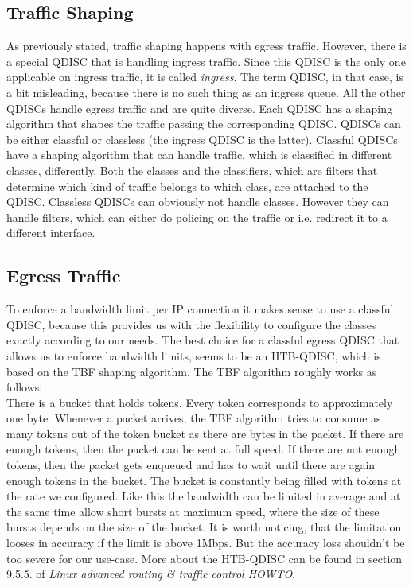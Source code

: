 \subsection{Traffic Shaping}
As previously stated, traffic shaping happens with egress traffic. However, there is a special \acs{QDISC} that is handling ingress traffic. Since this \acs{QDISC} is the only one applicable on ingress traffic, it is called \textit{ingress}. The term \acl{QDISC}, in that case, is a bit misleading, because there is no such thing as an ingress queue. All the other \acsp{QDISC} handle egress traffic and are quite diverse. Each \acs{QDISC} has a shaping algorithm that shapes the traffic passing the corresponding \acs{QDISC}. \acsp{QDISC} can be either classful or classless (the ingress \acs{QDISC} is the latter). Classful \acsp{QDISC} have a shaping algorithm that can handle traffic, which is classified in different classes, differently. Both the classes and the classifiers, which are filters that determine which kind of traffic belongs to which class, are attached to the \acs{QDISC}. Classless \acsp{QDISC} can obviously not handle classes. However they can handle filters, which can either do policing on the traffic or i.e. redirect it to a different interface.

\subsection{Egress Traffic}
To enforce a bandwidth limit per \acs{IP} connection it makes sense to use a classful \acs{QDISC}, because this provides us with the flexibility to configure the classes exactly according to our needs. The best choice for a classful egress \acs{QDISC} that allows us to enforce bandwidth limits, seems to be an \ac{HTB}-\acs{QDISC}, which is based on the \ac{TBF} shaping algorithm. The \acs{TBF} algorithm roughly works as follows: 
\\There is a bucket that holds tokens. Every token corresponds to approximately one byte. Whenever a packet arrives, the \acs{TBF} algorithm tries to consume as many tokens out of the token bucket as there are bytes in the packet. If there are enough tokens, then the packet can be sent at full speed. If there are not enough tokens, then the packet gets enqueued and has to wait until there are again enough tokens in the bucket. The bucket is constantly being filled with tokens at the rate we configured. Like this the bandwidth can be limited in average and at the same time allow short bursts at maximum speed, where the size of these bursts depends on the size of the bucket. It is worth noticing, that the limitation looses in accuracy if the limit is above 1Mbps. But the accuracy loss shouldn't be too severe for our use-case.
More about the \acs{HTB}-\acs{QDISC} can be found in section 9.5.5. of \textit{Linux advanced routing \& traffic control HOWTO}\cite{hubert2002linux}.


